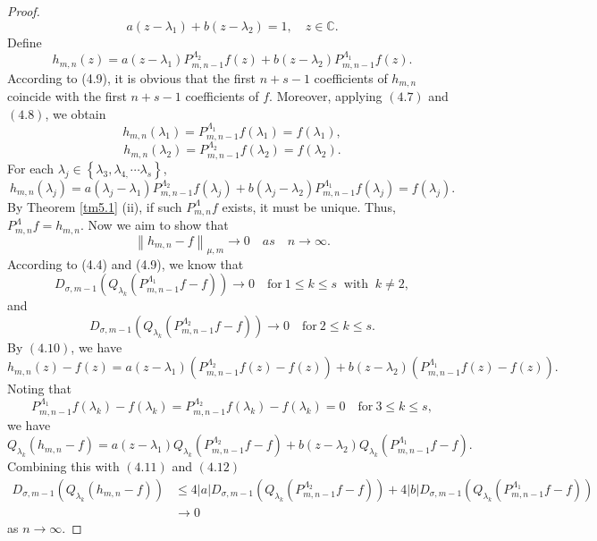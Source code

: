 \documentclass[12pt,reqno]{amsart}
\begin{document}
\begin{proof}
\begin{equation}
a(z - \lambda_1) + b(z - \lambda_2) = 1, \quad z \in \mathbb{C}. \tag{4.10}
\end{equation}
Define
\[{h_{m,n}}(z) = a(z - {\lambda _1})P_{m,n - 1}^{{\Lambda _2}}f(z) + b(z - {\lambda _2})P_{m,n - 1}^{{\Lambda _1}}f(z).\]
According to (4.9), it is obvious that the first $n+s-1$ coefficients of ${h_{m,n}}$ coincide with the first $n+s-1$ coefficients of $f$. Moreover, applying \((4.7)\) and \((4.8)\), we obtain
\[{h_{m,n}}({\lambda _1}) = P_{m,n - 1}^{{\Lambda _1}}f({\lambda _1}) = f({\lambda _1}),\]
\[{h_{m,n}}({\lambda _2}) = P_{m,n - 1}^{{\Lambda _2}}f({\lambda _2}) = f({\lambda _2}).\]
For each ${\lambda _j} \in \left\{ {{\lambda _3},{\lambda _{4,}} \cdots {\lambda _s}} \right\}$,
\[{h_{m,n}}({\lambda _j}) = a({\lambda _j} - {\lambda _1})P_{m,n - 1}^{{\Lambda _2}}f({\lambda _j}) + b({\lambda _j} - {\lambda _2})P_{m,n - 1}^{{\Lambda _1}}f({\lambda _j})=f({\lambda_j}).\]
By Theorem \ref{tm5.1} (ii), if such $P_{m,n}^\Lambda f$ exists, it must be unique. Thus, $P_{m,n}^\Lambda f={h_{m,n}}$.
Now we aim to show that $${\left\| {{h_{m,n}} - f} \right\|_{\mu ,m}} \to 0  \quad as \quad n \to \infty.$$
According to (4.4) and (4.9), we know that\\
\begin{equation}
{D_{\sigma ,m - 1}}({Q_{{\lambda _k}}}(P_{m,n - 1}^{{\Lambda _1}}f - f)) \to 0  \quad \text{for} \ 1 \leq k \leq s \ \text{~with~} \ k \ne 2 , \tag{4.11}
\end{equation}
and
\begin{equation}
{D_{\sigma ,m - 1}}({Q_{{\lambda _k}}}(P_{m,n - 1}^{{\Lambda _2}}f - f)) \to 0 \quad \text{for} \ 2 \leq k \leq s. \tag{4.12}
\end{equation}
By \((4.10)\), we have
\[{h_{m,n}}(z) - f(z) = a(z - {\lambda _1})(P_{m,n - 1}^{{\Lambda _2}}f(z) - f(z)) + b(z - {\lambda _2})(P_{m,n - 1}^{{\Lambda _1}}f(z) - f(z)).\]
Noting that
$$P_{m,n - 1}^{{\Lambda _1}}f({\lambda _k}) - f({\lambda _k}) = P_{m,n - 1}^{{\Lambda _2}}f({\lambda _k}) - f({\lambda _k}) = 0 \quad \text{for} \ 3 \le k \le s,$$
we have
\[{Q_{{\lambda _k}}}({h_{m,n}} - f) = a(z - {\lambda _1}){Q_{{\lambda _k}}}(P_{m,n - 1}^{{\Lambda _2}}f - f) + b(z - {\lambda _2}){Q_{{\lambda _k}}}(P_{m,n - 1}^{{\Lambda _1}}f - f).\]
Combining this with \((4.11)\) and \((4.12)\)
\begin{align*}
{D_{\sigma ,m - 1}}({Q_{{\lambda _k}}}({h_{m,n}} - f)) &\le 4\left| a \right|{D_{\sigma ,m - 1}}({Q_{{\lambda _k}}}(P_{m,n - 1}^{{\Lambda _2}}f - f)) + 4\left| b \right|{D_{\sigma ,m - 1}}({Q_{{\lambda _k}}}(P_{m,n - 1}^{{\Lambda _1}}f - f))\\
&\to 0
\end{align*}
as $ n \to \infty $.


\end{proof}
\end{document}
